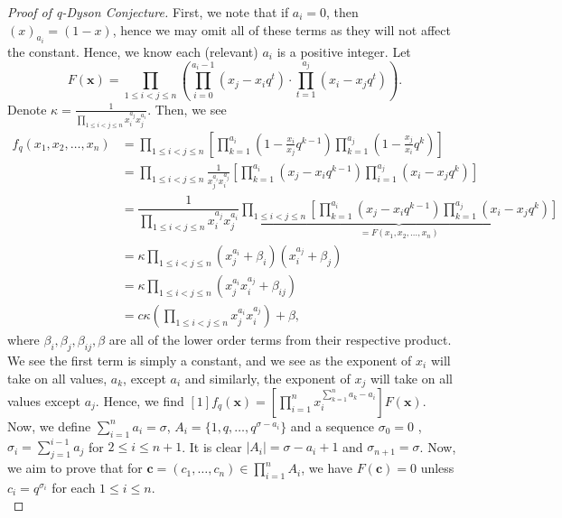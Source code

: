\begin{proof}[Proof of q-Dyson Conjecture]
	First, we note that if \(a_{i} = 0\), then \(\left( x \right) _{a_{i}} = \left( 1-x \right) \), hence we may omit all of these terms as they will not affect the constant. Hence, we know each (relevant) \(a_{i}\) is a positive integer. Let \[
		F\left( \textbf{x} \right) = \prod_{1 \le i < j \le n}^{} \left( \prod_{i=0}^{a_{i} - 1} \left( x_{j} - x_{i}q^{t} \right) \cdot \prod_{t=1}^{a_{j}} \left( x_{i} - x_{j}q^{t} \right)  \right)
	.\]
	 Denote \(\kappa = \frac{1}{\prod_{1 \le i < j \le n}^{} x_{i}^{a_{j}} x_{j} ^{a_{i}}}\). Then, we see
	\begin{align*}
		f_{q}\left( x_1, x_2, \ldots, x_{n} \right)  &= \prod_{1 \le i < j \le n}^{} [\prod_{k= 1}^{a_{i}}\left( 1 - \frac{x_{i}}{x_{j}}q^{k - 1} \right) \prod_{k=1}^{a_{j}} \left( 1 - \frac{x_{j}}{x_{i}} q^{k} \right)] \\
				       &= \prod_{1 \le i < j \le n}^{}  \frac{1}{x_{j}^{a_{i}} x_{i} ^{a_{j}}} [\prod_{k=1}^{a_{i}}\left( x_{j} - x_{i}q^{k-1} \right) \prod_{i= 1}^{a_{j}} \left( x_{i} - x_{j}q^{k} \right)]   \\
				       &= \dfrac{1}{\prod_{1 \le i < j \le n}^{} x_{i}^{a_{j}} x_{j}^{a_{i}}} \underbrace{\prod_{1 \le i < j \le n}^{} [\prod_{k=1}^{a_{i}} \left( x_{j} - x_{i}q^{k-1} \right) \prod_{k= 1}^{a_{j}}\left( x_{i} - x_{j}q^{k} \right) ]}_{= F\left( x_1, x_2, \ldots, x_{n} \right) } \\
				       &= \kappa \prod_{1 \le i < j \le n}^{}\left( x_{j}^{a_{i}} + \beta _{i} \right) \left( x_{i}^{a_{j}} + \beta _{j} \right)   \\
				       &= \kappa \prod_{1 \le i < j \le n}^{} (x_{j}^{a_{i}}x_{i}^{a_{j}} + \beta_{ij}) \\
				       &= c \kappa (\prod_{1 \le i < j \le n}^{} x_{j}^{a_{i}} x_{i}^{a_{j}}) + \beta,
	\end{align*} where \(\beta_{i}, \beta_{j}, \beta_{ij} , \beta\)  are all of the lower order terms from their respective product.  We see the first term is simply a constant, and we see as the exponent of \(x_{i}\) will take on all values, \(a_{k}\), except \(a_{i}\) and similarly, the exponent of \(x_{j}\) will take on all values except \(a_{j}\). Hence, we find \(\left[ 1 \right] f_{q}\left( \textbf{x} \right) = \left[ \prod_{i= 1}^{n} x_{i}^{\sum_{k = 1}^{n} a_{k} - a_{i}} \right]F\left( \textbf{x} \right)   \).\\
	Now, we define \(\sum_{i= 1}^{n} a_{i} = \sigma\), \(A_{i} = \{1, q, \ldots, q^{\sigma - a_{i}}\} \) and a sequence \(\sigma_0 = 0\) , \(\sigma_{i} = \sum_{j = 1}^{i-1} a_{j}\) for \(2 \le i \le n + 1\). It is clear \(\left| A_{i} \right|  = \sigma - a_{i} + 1	\) and \(\sigma _{n + 1} = \sigma\). Now, we aim to prove that for \(\textbf{c} = \left( c_1, \ldots, c_{n} \right)  \in \prod_{i= 1}^{n} A_{i}\), we have \(F\left( \textbf{c} \right) = 0 \) unless \(c_{i} = q^{\sigma_{i}}\) for each \(1 \le i \le n\).\\

\end{proof}
